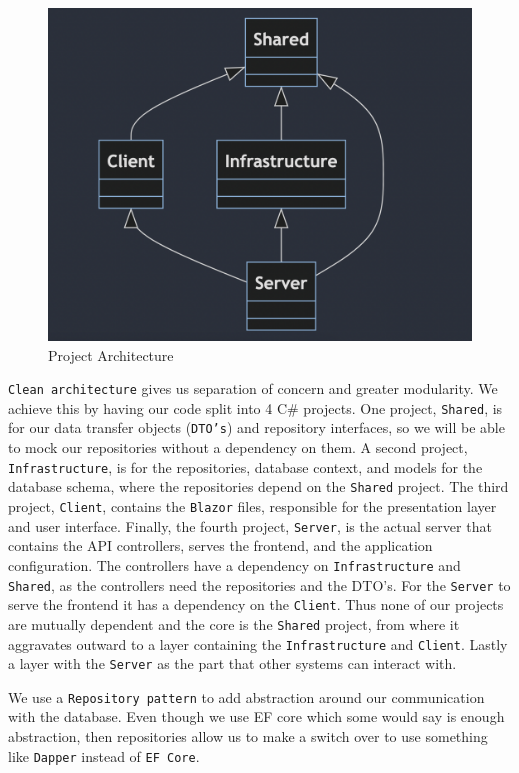\begin{figure}
    \includegraphics[width=0.9\linewidth]{Report/Images/onionStructure.png} 
    \caption{Project Architecture}
    \label{fig:projectDependencyGraph}
\end{figure}

\texttt{Clean architecture} gives us separation of concern and greater modularity. We achieve this by having our code split into 4 C\# projects. One project, \texttt{Shared}, is for our data transfer objects (\texttt{DTO's}) and repository interfaces, so we will be able to mock our repositories without a dependency on them. A second project, \texttt{Infrastructure}, is for the repositories, database context, and models for the database schema, where the repositories depend on the \texttt{Shared} project. The third project, \texttt{Client}, contains the \texttt{Blazor} files, responsible for the presentation layer and user interface. Finally, the fourth project, \texttt{Server}, is the actual server that contains the API controllers, serves the frontend, and the application configuration. The controllers have a dependency on \texttt{Infrastructure} and \texttt{Shared}, as the controllers need the repositories and the DTO's. For the \texttt{Server} to serve the frontend it has a dependency on the \texttt{Client}. Thus none of our projects are mutually dependent and the core is the \texttt{Shared} project, from where it aggravates outward to a layer containing the \texttt{Infrastructure} and \texttt{Client}. Lastly a layer with the \texttt{Server} as the part that other systems can interact with.

We use a \texttt{Repository pattern} to add abstraction around our communication with the database. Even though we use EF core which some would say is enough abstraction, then repositories allow us to make a switch over to use something like \texttt{Dapper} instead of \texttt{EF Core}.

